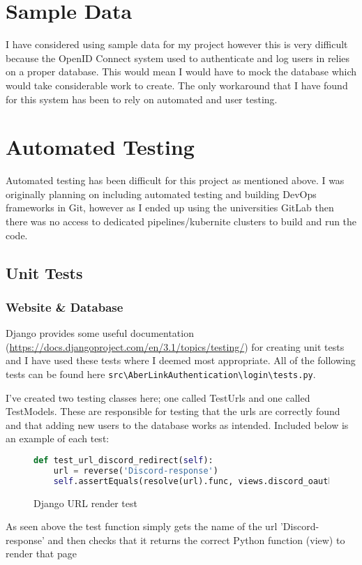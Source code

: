 
\section{Sample Data}
I have considered using sample data for my project however this is very difficult because the OpenID Connect \cite{OpenID} system used to authenticate and log users in relies on a proper database. This would mean I would have to mock the database which would take considerable work to create. The only workaround that I have found for this system has been to rely on automated and user testing.

\section{Automated Testing}
Automated testing has been difficult for this project as mentioned above. I was originally planning on including automated testing and building DevOps frameworks in Git, however as I ended up using the universities GitLab then there was no access to dedicated pipelines/kubernite clusters to build and run the code.  

\subsection{Unit Tests}

\subsubsection{Website \& Database}
Django provides some useful documentation (\href{https://docs.djangoproject.com/en/3.1/topics/testing/}{https://docs.djangoproject.com/en/3.1/topics/testing/}) for creating unit tests and I have used these tests where I deemed most appropriate. All of the following tests can be found here \verb|src\AberLinkAuthentication\login\tests.py|. 

I've created two testing classes here; one called TestUrls and one called TestModels. These are responsible for testing that the urls are correctly found and that adding new users to the database works as intended. Included below is an example of each test:

\begin{figure}[H]
\begin{lstlisting}[language=Python]
def test_url_discord_redirect(self):
    url = reverse('Discord-response')
    self.assertEquals(resolve(url).func, views.discord_oauth2_redirect)
\end{lstlisting}
\caption{Django URL render test}
\label{fig:django-url}
\end{figure}
As seen above the test function simply gets the name of the url 'Discord-response' and then checks that it returns the correct Python function (view) to render that page

